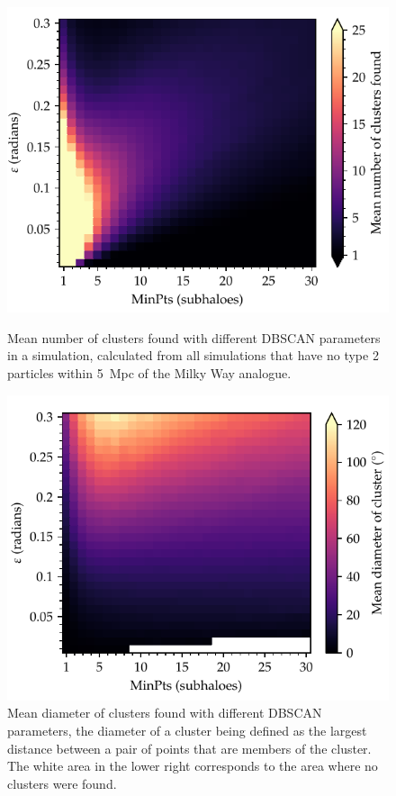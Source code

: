 \documentclass[english, twoside]{HYgradu}
\begin{document}
\begin{figure}
    \centering
    \includegraphics{kuvat/clusteringParameters.pdf}
    \caption{Mean number of clusters found with different DBSCAN parameters in a simulation, calculated from all simulations that have no type 2 particles within 5~Mpc of the Milky Way analogue.}\label{fig:clusteringparameters}

	\bigskip

    \includegraphics{kuvat/clusterDiameter.pdf}
    \caption{Mean diameter of clusters found with different DBSCAN parameters, the diameter of a cluster being defined as the largest distance between a pair of points that are members of the cluster. The white area in the lower right corresponds to the area where no clusters were found. }\label{fig:clusterdiameter}
\end{figure}
\end{document}
